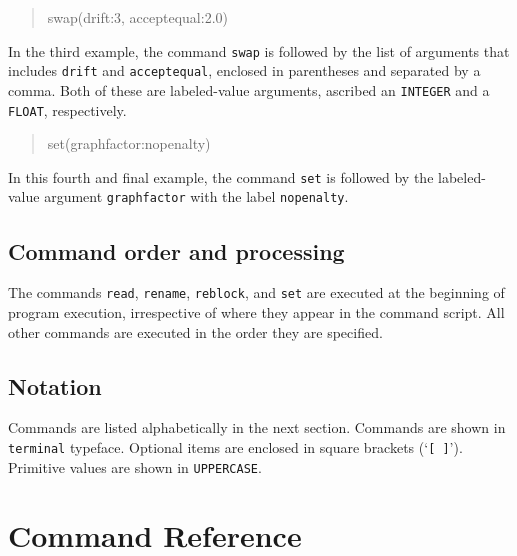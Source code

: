 \documentclass[11pt]{book}
\begin{document}
{{		\begin{quote}
		swap(drift:3, acceptequal:2.0)
		\end{quote}
				
		\noindent In the third example, the command \texttt{swap} is followed by the list 
		of arguments that includes \texttt{drift} and \texttt{acceptequal}, enclosed in 
		parentheses and separated by a comma. Both of these are labeled-value arguments, 
		ascribed an \texttt{INTEGER} and a \texttt{FLOAT}, respectively.
		
		\begin{quote}
		set(graphfactor:nopenalty) 
		\end{quote}
		
		\noindent In this fourth and final example, the command \texttt{set} is followed by the 
		labeled-value argument \texttt{graphfactor} with the label \texttt{nopenalty}.
				
	\subsection{Command order and processing}
		The commands \texttt{read}, \texttt{rename}, \texttt{reblock}, and \texttt{set} are 
		executed at the beginning of program execution, irrespective of where they appear 
		in the command script. All other commands are executed in the order they are specified. 
		
	\subsection{Notation}
		Commands are listed alphabetically in the next section. Commands are shown in 
		\texttt{terminal} typeface. Optional items are enclosed in square brackets (`\texttt{[ ]}').
		Primitive values are shown in \texttt{UPPERCASE}. 
	


\section{Command Reference}
	

}}
\end{document}
